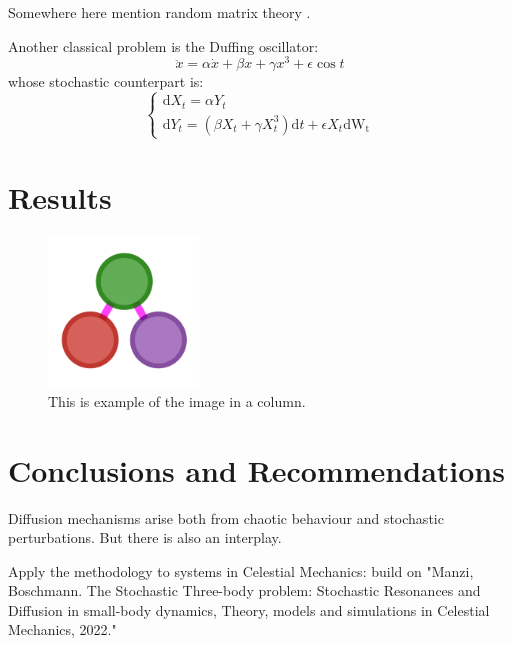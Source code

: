 \documentclass{juliacon}
\newcommand{\drv}{\textrm{d}}
\begin{document}
Somewhere here mention random matrix theory \cite{potters_bouchaud_2020}.

Another classical problem is the Duffing oscillator:
\begin{equation}
\ddot{x}=\alpha \dot{x}+\beta x+\gamma x^3 + \epsilon\cos{t}
\end{equation}
whose stochastic counterpart is: 
\begin{equation}
    \begin{cases}
    \drv X_t= \alpha Y_t \\
    \drv Y_t = (\beta X_t + \gamma X_t^3)\drv t +\epsilon X_t \drv \mathrm{W_t} 
\end{cases}
\end{equation}


\section{Results}

\begin{figure}[h]
    \centerline{\includegraphics[width=4cm]{juliagraphs.png}}
    \caption{This is example of the image in a column.}
        \label{fig:sample_figure}
    \end{figure}

\section{Conclusions and Recommendations}
Diffusion mechanisms arise both from chaotic behaviour and stochastic perturbations. But there is also an interplay.

Apply the methodology to systems in Celestial Mechanics: build on "Manzi, Boschmann. The Stochastic Three-body problem: Stochastic Resonances and Diffusion in small-body dynamics, Theory, models and simulations in Celestial Mechanics, 2022."


\end{document}
